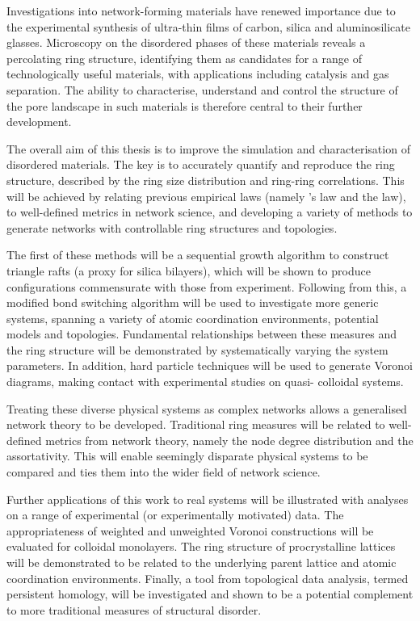 Investigations into \td{} network\--forming materials have renewed importance due to the experimental synthesis of ultra\--thin films of carbon, silica and aluminosilicate glasses.
Microscopy on the disordered phases of these materials reveals a percolating ring structure, identifying them as candidates for a range of technologically useful materials, with applications including catalysis and gas separation.
The ability to characterise, understand and control the structure of the pore landscape in such materials is therefore central to their further development.

The overall aim of this thesis is to improve the simulation and characterisation of \td{} disordered materials.
The key is to accurately quantify and reproduce the ring structure, described by the ring size distribution and ring\--ring correlations.
This will be achieved by relating previous empirical laws (namely \lm's law and the \aw{} law), to well\--defined metrics in network science, and developing a variety of \mc{} methods to generate networks with controllable ring structures and topologies.

The first of these methods will be a sequential growth algorithm to construct triangle rafts (a proxy for silica bilayers), which will be shown to produce configurations commensurate with those from experiment.
Following from this, a modified bond switching algorithm will be used to investigate more generic systems, spanning a variety of atomic coordination environments, potential models and topologies. 
Fundamental relationships between these measures and the ring structure will be demonstrated by systematically varying the system parameters.
In addition, hard particle \mc{} techniques will be used to generate Voronoi diagrams, making contact with experimental studies on quasi\--\td{} colloidal systems.

Treating these diverse physical systems as complex networks allows a generalised network theory to be developed.
Traditional ring measures will be related to well\--defined metrics from network theory, namely the node degree distribution and the assortativity.
This will enable seemingly disparate physical systems to be compared and ties them into the wider field of network science.

Further applications of this work to real systems will be illustrated with analyses on a range of experimental (or experimentally motivated) data.
The appropriateness of weighted and unweighted Voronoi constructions will be evaluated for colloidal monolayers.
The ring structure of procrystalline lattices will be demonstrated to be related to the underlying parent lattice and atomic coordination environments.
Finally, a tool from topological data analysis, termed persistent homology, will be investigated and shown to be a potential complement to more traditional measures of structural disorder.

